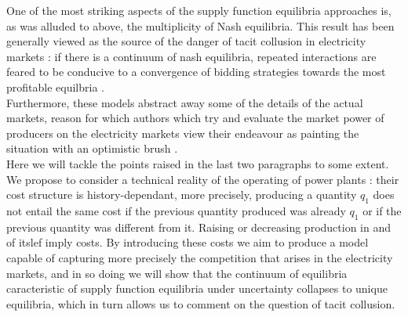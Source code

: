 One of the most striking aspects of the supply function equilibria approaches is, as was alluded to above, the multiplicity of Nash equilibria. This result has been generally viewed as the source of the danger of tacit collusion in electricity markets : if there is a continuum of nash equilibria, repeated interactions are feared to be conducive to a convergence of bidding strategies towards the most profitable equilbria \cite{bolle1992supply}. \\

Furthermore, these models abstract away some of the details of the actual markets, reason for which authors which try and evaluate the market power of producers on the electricity markets view their endeavour as painting the situation with an optimistic brush \cite{Newgreen}. \\

Here we will tackle the points raised in the last two paragraphs to some extent. We propose to consider a technical reality of the operating of power plants : their cost structure is history-dependant, more precisely, producing a quantity $q_1$ does not entail the same cost if the previous quantity produced was already $q_1$ or if the previous quantity was different from it. Raising or decreasing production in and of itslef imply costs. By introducing these costs we aim to produce a model capable of capturing more precisely the competition that arises in the electricity markets, and in so doing we will show that the continuum of equilibria caracteristic of supply function equilibria under uncertainty collapses to unique equilibria, which in turn allows us to comment on the question of tacit collusion.\\


